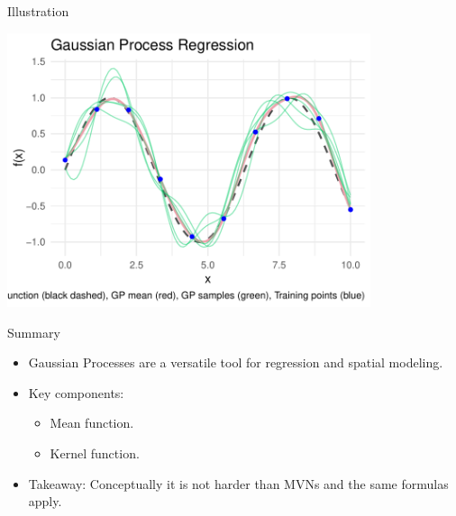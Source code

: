 \documentclass[11pt,handout,aspectratio=169]{beamer}
\begin{document}
%
%
%
%

\begin{frame}{Illustration}
	\begin{center}
		\includegraphics[width=0.8\textwidth]{pics/GP_nonpreg.pdf}
	\end{center}
\end{frame}

\begin{frame}{Summary}
\begin{itemize}
    \item Gaussian Processes are a versatile tool for regression and spatial modeling.
    \item Key components:
    \begin{itemize}
        \item Mean function.
        \item Kernel function.
    \end{itemize}
    \item Takeaway: Conceptually it is not harder than MVNs and the same formulas apply.
\end{itemize}
\end{frame}
\end{document}
